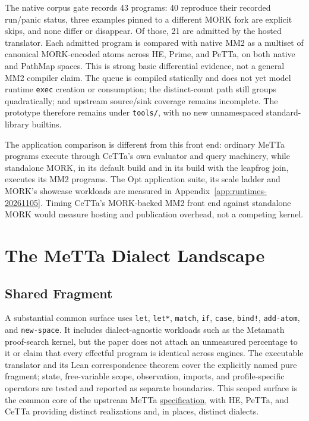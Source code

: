 \documentclass[11pt]{article}
\newcommand{\code}[1]{\texttt{#1}}
\newcommand{\PeTTa}{\textup{PeTTa}}
\newcommand{\HE}{\textup{HE}}
\newcommand{\CeTTa}{\textup{CeTTa}}
\newcommand{\PathMap}{\textup{PathMap}}
\begin{document}
The native corpus gate records 43 programs: 40 reproduce their recorded
run/panic status, three examples pinned to a different MORK fork are explicit
skips, and none differ or disappear.  Of those, 21 are admitted by the hosted
translator.  Each admitted program is compared with native MM2 as a multiset
of canonical MORK-encoded atoms across HE, Prime, and \PeTTa{}, on both native
and \PathMap{} spaces.  This is strong basic differential evidence, not a
general MM2 compiler claim.  The queue is compiled statically and does not
yet model runtime \code{exec} creation or consumption; the distinct-count
path still groups quadratically; and upstream source/sink coverage remains
incomplete.  The prototype therefore remains under \code{tools/}, with no
new unnamespaced standard-library builtins.

The application comparison is different from this front end: ordinary
MeTTa programs execute through \CeTTa{}'s own evaluator and query machinery,
while standalone MORK, in its default build and in its build with the
leapfrog join, executes its MM2 programs.  The Opt application suite, its
scale ladder and MORK's showcase workloads are measured in
Appendix~\ref{app:runtimes-20261105}.  Timing \CeTTa{}'s MORK-backed MM2
front end against standalone MORK would measure hosting and publication
overhead, not a competing kernel.

\section{The MeTTa Dialect Landscape}

\subsection{Shared Fragment}

A substantial common surface uses \code{let}, \code{let*}, \code{match},
\code{if}, \code{case}, \code{bind!}, \code{add-atom}, and
\code{new-space}.  It includes dialect-agnostic workloads such as the
Metamath proof-search kernel, but the paper does not attach an unmeasured
percentage to it or claim that every effectful program is identical across
engines.  The executable translator and its Lean correspondence theorem
cover the explicitly named pure fragment; state, free-variable scope,
observation, imports, and profile-specific operators are tested and reported
as separate boundaries.  This scoped surface is the common core of the
upstream MeTTa
\href{https://trueagi-io.github.io/hyperon-experimental/metta/}{specification},
with \HE{}, \PeTTa{}, and \CeTTa{} providing distinct realizations and, in
places, distinct dialects.
\end{document}
